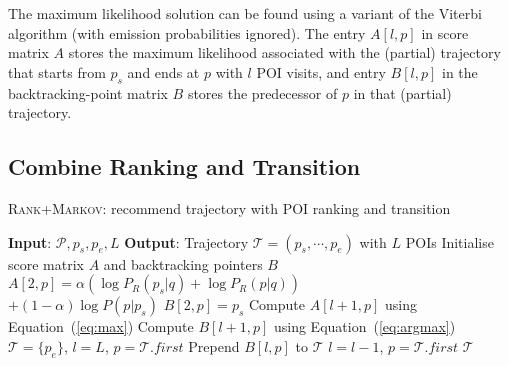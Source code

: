 The maximum likelihood solution can be found using a variant of the Viterbi algorithm (with emission probabilities ignored).
The entry $A[l, p]$ in score matrix $A$ stores the maximum likelihood associated with the (partial) trajectory 
that starts from $p_s$ and ends at $p$ with $l$ POI visits, 
and entry $B[l, p]$ in the backtracking-point matrix $B$ stores the predecessor of $p$ in that (partial) trajectory.



\subsection{Combine Ranking and Transition}
\label{sec:rank+markov}


\begin{algorithm}[t]
\caption{\textsc{Rank+Markov}: recommend trajectory with POI ranking and transition}
\label{alg:rank+markov}
\begin{algorithmic}[1]
\STATE \textbf{Input}: $\mathcal{P}, p_s, p_e, L$
\STATE \textbf{Output}: Trajectory $\mathcal{T} = (p_s, \cdots, p_e)$ with $L$ POIs
\STATE Initialise score matrix $A$ and backtracking pointers $B$
    \STATE $A[2, p] = \alpha ( \log P_R(p_s|q) + \log P_R(p|q) )$ \\ \hfill $+ (1-\alpha) \log P(p|p_s)$
    \STATE $B[2, p] = p_s$
\ENDFOR
{}
        \STATE Compute $A[l+1, p]$ using Equation~(\ref{eq:max})
        \STATE Compute $B[l+1, p]$ using Equation~(\ref{eq:argmax})
    \ENDFOR
\ENDFOR
\STATE $\mathcal{T}= \{p_e\}$, $l = L$, $p = \mathcal{T}.first$
\REPEAT
    \STATE Prepend $B[l, p]$ to $\mathcal{T}$
    \STATE $l = l - 1$, $p = \mathcal{T}.first$
\RETURN $\mathcal{T}$
\end{algorithmic}
\end{algorithm}




